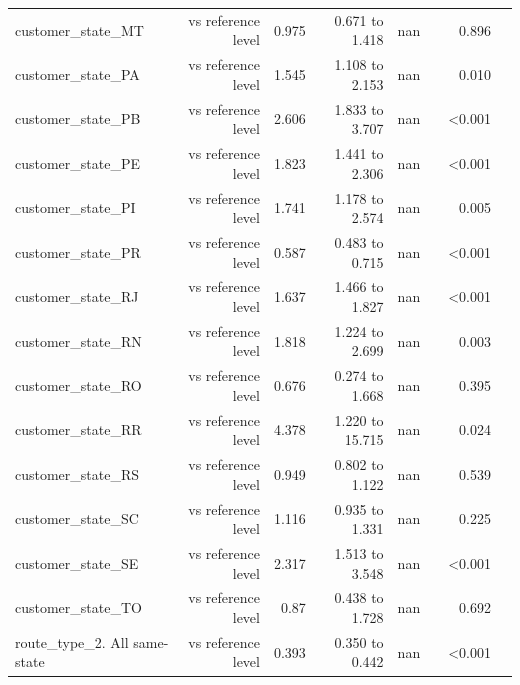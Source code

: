 \begin{table}[htbp]
\begin{tabular}{lrrrrrrr}
customer\_state\_MT & vs reference level & 0.975 & 0.671 to 1.418 & nan &  & 0.896 &  \\
customer\_state\_PA & vs reference level & 1.545 & 1.108 to 2.153 & nan &  & 0.010 &  \\
customer\_state\_PB & vs reference level & 2.606 & 1.833 to 3.707 & nan &  & <0.001 &  \\
customer\_state\_PE & vs reference level & 1.823 & 1.441 to 2.306 & nan &  & <0.001 &  \\
customer\_state\_PI & vs reference level & 1.741 & 1.178 to 2.574 & nan &  & 0.005 &  \\
customer\_state\_PR & vs reference level & 0.587 & 0.483 to 0.715 & nan &  & <0.001 &  \\
customer\_state\_RJ & vs reference level & 1.637 & 1.466 to 1.827 & nan &  & <0.001 &  \\
customer\_state\_RN & vs reference level & 1.818 & 1.224 to 2.699 & nan &  & 0.003 &  \\
customer\_state\_RO & vs reference level & 0.676 & 0.274 to 1.668 & nan &  & 0.395 &  \\
customer\_state\_RR & vs reference level & 4.378 & 1.220 to 15.715 & nan &  & 0.024 &  \\
customer\_state\_RS & vs reference level & 0.949 & 0.802 to 1.122 & nan &  & 0.539 &  \\
customer\_state\_SC & vs reference level & 1.116 & 0.935 to 1.331 & nan &  & 0.225 &  \\
customer\_state\_SE & vs reference level & 2.317 & 1.513 to 3.548 & nan &  & <0.001 &  \\
customer\_state\_TO & vs reference level & 0.87 & 0.438 to 1.728 & nan &  & 0.692 &  \\
route\_type\_2. All same-state & vs reference level & 0.393 & 0.350 to 0.442 & nan &  & <0.001 &  \\
\bottomrule
\end{tabular}
\par\smallskip\begin{minipage}{\linewidth}\footnotesize \end{minipage}
\end{table}


